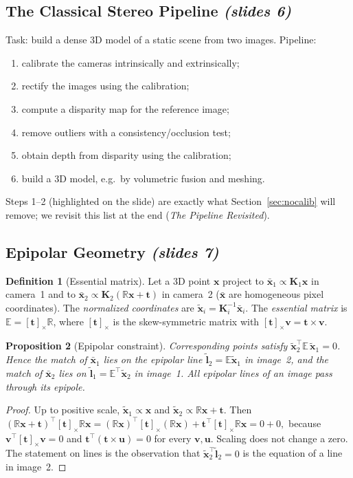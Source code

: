 \documentclass[11pt,a4paper]{article}
\newcommand{\slr}[1]{\texorpdfstring{\emph{(slides #1)}}{(slides #1)}}
\newcommand{\R}{\mathbb{R}}
\newcommand{\E}{\mathbb{E}}
\newcommand{\K}{\mathbf{K}}
\newcommand{\vx}{\bm{x}}
\newcommand{\xt}{\tilde{\mathbf{x}}}
\newcommand{\xb}{\bar{\bm{x}}}
\newcommand{\vt}{\bm{t}}
\theoremstyle{definition}
\newtheorem{definition}{Definition}[section]
\theoremstyle{plain}
\newtheorem{proposition}[definition]{Proposition}
\theoremstyle{remark}
\begin{document}
\subsection{The Classical Stereo Pipeline \slr{6}}
Task: build a dense 3D model of a static scene from two images. Pipeline:
\begin{enumerate}
\item calibrate the cameras intrinsically and extrinsically;
\item rectify the images using the calibration;
\item compute a disparity map for the reference image;
\item remove outliers with a consistency/occlusion test;
\item obtain depth from disparity using the calibration;
\item build a 3D model, e.g.\ by volumetric fusion and meshing.
\end{enumerate}
Steps 1--2 (highlighted on the slide) are exactly what Section~\ref{sec:nocalib} will remove; we revisit this list at the end (\emph{The Pipeline Revisited}).

\subsection{Epipolar Geometry \slr{7}}
\begin{definition}[Essential matrix]
Let a 3D point $\vx$ project to $\xb_1\propto \K_1\vx$ in camera~1 and to $\xb_2\propto\K_2(\R\vx+\vt)$ in camera~2 ($\xb$ are homogeneous pixel coordinates). The \emph{normalized coordinates} are $\xt_i=\K_i^{-1}\xb_i$. The \emph{essential matrix} is $\E=[\vt]_\times\R$, where $[\vt]_\times$ is the skew-symmetric matrix with $[\vt]_\times\bm v=\vt\times\bm v$.
\end{definition}

\begin{proposition}[Epipolar constraint]\label{prop:epi}
Corresponding points satisfy $\xt_2^{\top}\E\,\xt_1=0$. Hence the match of $\xb_1$ lies on the \emph{epipolar line} $\tilde{\bm l}_2=\E\xt_1$ in image~2, and the match of $\xb_2$ lies on $\tilde{\bm l}_1=\E^{\top}\xt_2$ in image~1. All epipolar lines of an image pass through its \emph{epipole}.
\end{proposition}
\begin{proof}
Up to positive scale, $\xt_1\propto\vx$ and $\xt_2\propto\R\vx+\vt$. Then
$(\R\vx+\vt)^{\top}[\vt]_\times\R\vx=(\R\vx)^{\top}[\vt]_\times(\R\vx)+\vt^{\top}[\vt]_\times\R\vx=0+0,$
because $\bm v^{\top}[\vt]_\times\bm v=0$ and $\vt^{\top}(\vt\times\bm u)=0$ for every $\bm v,\bm u$. Scaling does not change a zero. The statement on lines is the observation that $\xt_2^{\top}\tilde{\bm l}_2=0$ is the equation of a line in image~2.
\end{proof}
\end{document}
